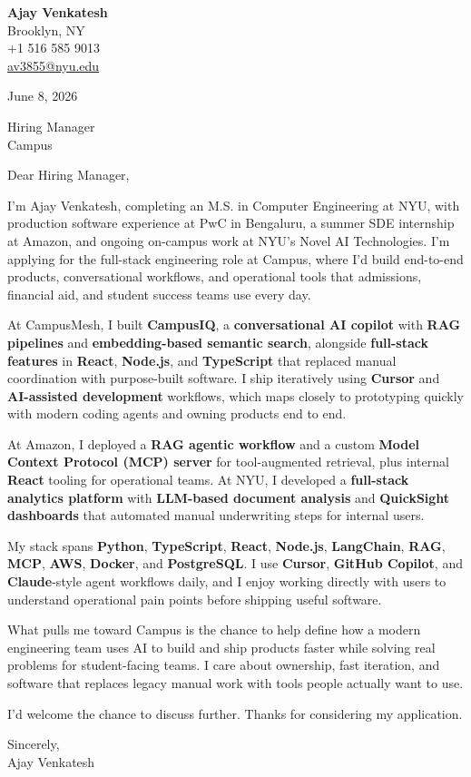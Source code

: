 \documentclass[letterpaper,11pt]{article}
\begin{document}
\begin{flushleft}
\textbf{\large Ajay Venkatesh} \\
Brooklyn, NY \\
+1 516 585 9013 \\
\href{mailto:av3855@nyu.edu}{av3855@nyu.edu}
\end{flushleft}
\vspace{10pt}
June 8, 2026
\vspace{6pt}

Hiring Manager \\
Campus

\vspace{10pt}

Dear Hiring Manager,

I'm Ajay Venkatesh, completing an M.S. in Computer Engineering at NYU, with production software experience at PwC in Bengaluru, a summer SDE internship at Amazon, and ongoing on-campus work at NYU's Novel AI Technologies. I'm applying for the full-stack engineering role at Campus, where I'd build end-to-end products, conversational workflows, and operational tools that admissions, financial aid, and student success teams use every day.

At CampusMesh, I built \textbf{CampusIQ}, a \textbf{conversational AI copilot} with \textbf{RAG pipelines} and \textbf{embedding-based semantic search}, alongside \textbf{full-stack features} in \textbf{React}, \textbf{Node.js}, and \textbf{TypeScript} that replaced manual coordination with purpose-built software. I ship iteratively using \textbf{Cursor} and \textbf{AI-assisted development} workflows, which maps closely to prototyping quickly with modern coding agents and owning products end to end.

At Amazon, I deployed a \textbf{RAG agentic workflow} and a custom \textbf{Model Context Protocol (MCP) server} for tool-augmented retrieval, plus internal \textbf{React} tooling for operational teams. At NYU, I developed a \textbf{full-stack analytics platform} with \textbf{LLM-based document analysis} and \textbf{QuickSight dashboards} that automated manual underwriting steps for internal users.

My stack spans \textbf{Python}, \textbf{TypeScript}, \textbf{React}, \textbf{Node.js}, \textbf{LangChain}, \textbf{RAG}, \textbf{MCP}, \textbf{AWS}, \textbf{Docker}, and \textbf{PostgreSQL}. I use \textbf{Cursor}, \textbf{GitHub Copilot}, and \textbf{Claude}-style agent workflows daily, and I enjoy working directly with users to understand operational pain points before shipping useful software.

What pulls me toward Campus is the chance to help define how a modern engineering team uses AI to build and ship products faster while solving real problems for student-facing teams. I care about ownership, fast iteration, and software that replaces legacy manual work with tools people actually want to use.

I'd welcome the chance to discuss further. Thanks for considering my application.

\vspace{12pt}
Sincerely, \\
Ajay Venkatesh
\end{document}
